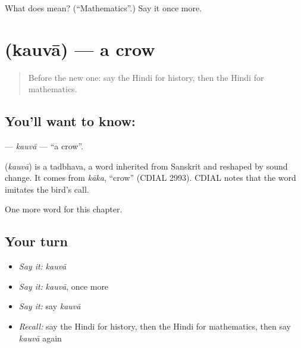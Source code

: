 \begin{tcolorbox}[breakable,colback=teal!4,colframe=teal!35!black,title={Before you move on}]
What does  mean? (\textquotedblleft{}Mathematics\textquotedblright{}.) Say it once more.
\end{tcolorbox}
\section[\texorpdfstring{\hi{कौवा} (kauvā)}{कौवा (kauvā)}]{ (kauvā) — a crow}

\label{lesson:HI-C199-kauva}



\begin{quote}
Before the new one: say the Hindi for history, then the Hindi for mathematics.
\end{quote}

\subsection*{You'll want to know: }
\textbf{} — \emph{kauvā} — \textquotedblleft{}a crow\textquotedblright{}.

\begin{cousinweb}
\textbf{} (\emph{kauvā}) is a tadbhava, a word inherited from Sanskrit and reshaped by sound change. It comes from \emph{kāka}, \textquotedblleft{}crow\textquotedblright{} (CDIAL 2993). CDIAL notes that the word imitates the bird's call.
\end{cousinweb}

\begin{grammarlens}[title={What you've built}]
One more word for this chapter.
\end{grammarlens}

\subsection*{Your turn}
\begin{itemize}
\raggedright
  \item \emph{Say it:} \emph{kauvā}
  \item \emph{Say it:} \emph{kauvā}, once more
  \item \emph{Say it:} say \emph{kauvā}
  \item \emph{Recall:} say the Hindi for history, then the Hindi for mathematics, then say \emph{kauvā} again
\end{itemize}

